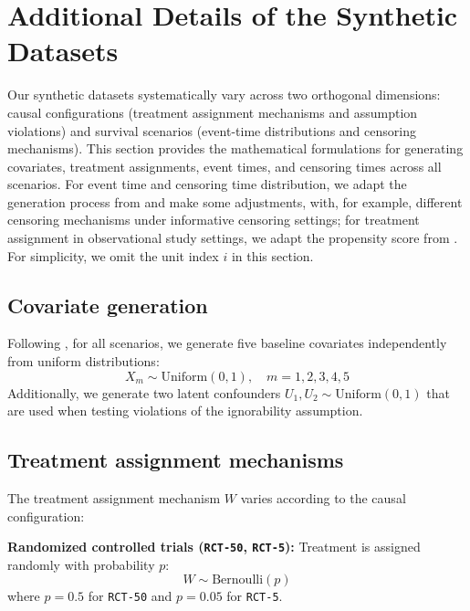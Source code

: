 \documentclass{article} %
\begin{document}
\clearpage


\section{Additional Details of the Synthetic Datasets}\label{app:synthetic-dataset}

Our synthetic datasets systematically vary across two orthogonal dimensions: causal configurations (treatment assignment mechanisms and assumption violations) and survival scenarios (event-time distributions and censoring mechanisms). This section provides the mathematical formulations for generating covariates, treatment assignments, event times, and censoring times across all scenarios. For event time and censoring time distribution, we adapt the generation process from \citet{meir2025heterogeneous} and make some adjustments, with, for example, different censoring mechanisms under informative censoring settings; for treatment assignment in observational study settings, we adapt the propensity score from \citet{cui2023estimating}. For simplicity, we omit the unit index $i$ in this section.

\subsection{Covariate generation}
Following \citet{cui2023estimating, meir2025heterogeneous}, for all scenarios, we generate five baseline covariates independently from uniform distributions:
\begin{equation*}
X_m \sim \text{Uniform}(0,1), \quad m = 1, 2, 3, 4, 5
\end{equation*}
Additionally, we generate two latent confounders $U_1, U_2 \sim \text{Uniform}(0,1)$ that are used when testing violations of the ignorability assumption.

\subsection{Treatment assignment mechanisms}
The treatment assignment mechanism $W$ varies according to the causal configuration:

\textbf{Randomized controlled trials (\texttt{RCT-50}, \texttt{RCT-5}):} Treatment is assigned randomly with probability $p$:
\begin{equation*}
W \sim \text{Bernoulli}(p)
\end{equation*}
where $p = 0.5$ for \texttt{RCT-50} and $p = 0.05$ for \texttt{RCT-5}.
\end{document}
